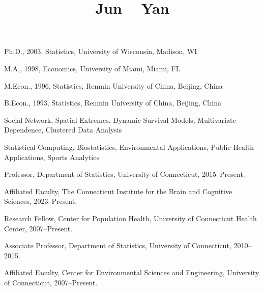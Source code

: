 \documentclass[Statistics]{vita}
\begin{document}
\title{Jun ~ Yan}

\begin{vita}
  \begin{Degrees}\label{degrees}
  \item Ph.D., 2003, Statistics, University of Wisconsin, Madison, WI
  \item M.A., 1998, Economics, University of Miami, Miami, FL
  \item M.Econ., 1996, Statistics, Renmin University of China, Beijing, China
  \item B.Econ., 1993, Statistics, Renmin University of China, Beijing, China
  \end{Degrees}
  \begin{ResearchInterests}
  \item Social Network, Spatial Extremes, Dynamic Survival Models, Multivariate Dependence, Clustered Data Analysis
  \item Statistical Computing, Biostatistics, Environmental Applications, Public Health Applications, Sports Analytics
  \end{ResearchInterests}
  \begin{Positions}
  \item Professor, Department of Statistics, University of Connecticut, 2015--Present.
  \item Affiliated Faculty, The Connecticut Institute for the Brain and Cognitive Sciences, 2023--Present.
  \item Research Fellow, Center for Population Health, University of Connecticut Health Center, 2007--Present.
  \item Associate Professor, Department of Statistics, University of Connecticut, 2010--2015.
  \item Affiliated Faculty, Center for Environmental Sciences and Engineering, University of Connecticut, 2007--Present.

\end{Positions}
\end{vita}
\end{document}
